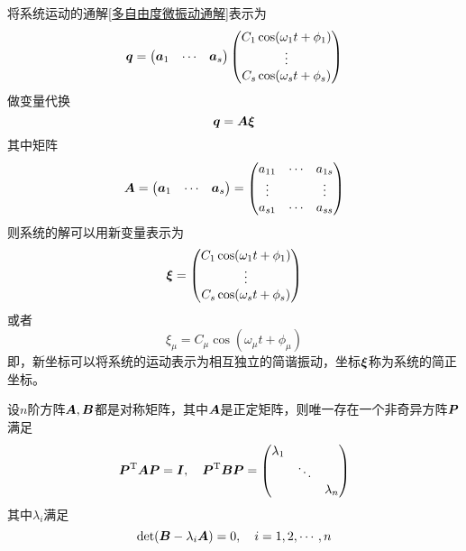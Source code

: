 将系统运动的通解\eqref{多自由度微振动通解}表示为
\begin{equation*}
	\boldsymbol{q} = \begin{pmatrix} \boldsymbol{a}_1 & \cdots & \boldsymbol{a}_s \end{pmatrix} \begin{pmatrix} C_1 \cos (\omega_1 t + \phi_1) \\ \vdots \\ C_s \cos (\omega_s t + \phi_s) \end{pmatrix}
\end{equation*}
做变量代换
\begin{equation*}
	\boldsymbol{q} = \boldsymbol{A} \boldsymbol{\xi}
\end{equation*}
其中矩阵
\begin{equation*}
	\boldsymbol{A} = \begin{pmatrix} \boldsymbol{a}_1 & \cdots & \boldsymbol{a}_s \end{pmatrix} = \begin{pmatrix} a_{11} & \cdots & a_{1s} \\ \vdots & & \vdots \\ a_{s1} & \cdots & a_{ss} \end{pmatrix}
\end{equation*}
则系统的解可以用新变量表示为
\begin{equation}
	\boldsymbol{\xi} = \begin{pmatrix} C_1 \cos (\omega_1 t + \phi_1) \\ \vdots \\ C_s \cos (\omega_s t + \phi_s) \end{pmatrix}
\end{equation}
或者
\begin{equation}
	\xi_\mu = C_\mu \cos (\omega_\mu t+ \phi_\mu)
\end{equation}
即，新坐标可以将系统的运动表示为相互独立的简谐振动，坐标$\boldsymbol{\xi}$称为系统的{\heiti 简正坐标}。

\begin{theorem}[同时对角化]
设$n$阶方阵$\boldsymbol{A},\boldsymbol{B}$都是对称矩阵，其中$\boldsymbol{A}$是正定矩阵，则唯一存在一个非奇异方阵$\boldsymbol{P}$满足
\begin{equation*}
	\boldsymbol{P}^{\mathrm{T}} \boldsymbol{A} \boldsymbol{P} = \boldsymbol{I},\quad \boldsymbol{P}^{\mathrm{T}} \boldsymbol{B} \boldsymbol{P} = \begin{pmatrix} \lambda_1 & & \\ & \ddots & \\ & & \lambda_n \end{pmatrix}
\end{equation*}
其中$\lambda_i$满足
\begin{equation*}
	\det(\boldsymbol{B} - \lambda_i \boldsymbol{A}) = 0,\quad i=1,2,\cdots,n
\end{equation*}
\end{theorem}


